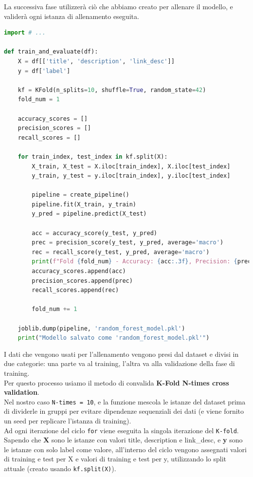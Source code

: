 \documentclass[a4paper,12pt]{report}
\begin{document}
\hfill \break
La successiva fase utilizzerà ciò che abbiamo creato per allenare il modello, e validerà ogni istanza di allenamento eseguita.
\begin{lstlisting}[language=Python]
import # ...

def train_and_evaluate(df):
    X = df[['title', 'description', 'link_desc']]
    y = df['label']

    kf = KFold(n_splits=10, shuffle=True, random_state=42)
    fold_num = 1

    accuracy_scores = []
    precision_scores = []
    recall_scores = []
    
    for train_index, test_index in kf.split(X):
        X_train, X_test = X.iloc[train_index], X.iloc[test_index]
        y_train, y_test = y.iloc[train_index], y.iloc[test_index]

        pipeline = create_pipeline()
        pipeline.fit(X_train, y_train)
        y_pred = pipeline.predict(X_test)

        acc = accuracy_score(y_test, y_pred)
        prec = precision_score(y_test, y_pred, average='macro')
        rec = recall_score(y_test, y_pred, average='macro')
        print(f"Fold {fold_num} - Accuracy: {acc:.3f}, Precision: {prec:.3f}, Recall: {rec:.3f}")
        accuracy_scores.append(acc)
        precision_scores.append(prec)
        recall_scores.append(rec)

        fold_num += 1

    joblib.dump(pipeline, 'random_forest_model.pkl')
    print("Modello salvato come 'random_forest_model.pkl'")
\end{lstlisting}
I dati che vengono usati per l'allenamento vengono presi dal dataset e divisi in due categorie: una parte va al training, l'altra va alla validazione della fase di training.\\
Per questo processo usiamo il metodo di convalida \textbf{K-Fold N-times cross validation}.\\
Nel nostro caso \texttt{N-times = 10}, e la funzione mescola le istanze del dataset prima di dividerle in gruppi per evitare dipendenze sequenziali dei dati (e viene fornito un seed per replicare l'istanza di training).\\
Ad ogni iterazione del ciclo \texttt{for} viene eseguita la singola iterazione del \texttt{K-fold}.\\
Sapendo che \textbf{X} sono le istanze con valori title, description e link\_desc, e \textbf{y} sono le istanze con solo label come valore, all'interno del ciclo vengono assegnati valori di training e test per X e valori di training e test per y, utilizzando lo split attuale (creato usando \texttt{kf.split(X)}).\\
\end{document}
